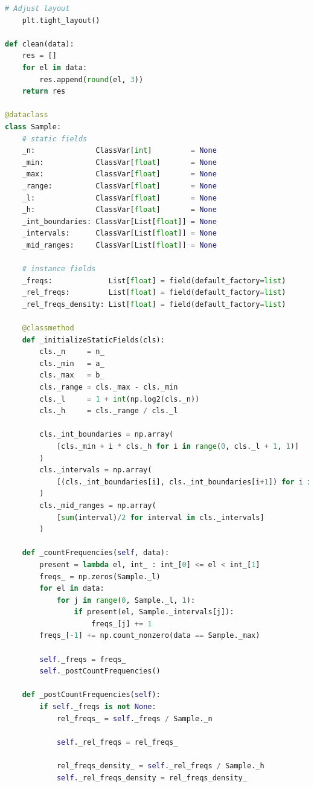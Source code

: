 \documentclass[a4paper, 14pt]{extarticle}
\begin{document}
\begin{center}
\begin{lstlisting}[language=Python]
    # Adjust layout
    plt.tight_layout()

def clean(data):
    res = []
    for el in data:
        res.append(round(el, 3))
    return res

@dataclass
class Sample:
    # static fields
    _n:              ClassVar[int]         = None
    _min:            ClassVar[float]       = None
    _max:            ClassVar[float]       = None
    _range:          ClassVar[float]       = None
    _l:              ClassVar[float]       = None
    _h:              ClassVar[float]       = None
    _int_boundaries: ClassVar[List[float]] = None
    _intervals:      ClassVar[List[float]] = None
    _mid_ranges:     ClassVar[List[float]] = None

    # instance fields
    _freqs:             List[float] = field(default_factory=list)
    _rel_freqs:         List[float] = field(default_factory=list)
    _rel_freqs_density: List[float] = field(default_factory=list)

    @classmethod
    def _initializeStaticFields(cls):
        cls._n     = n_
        cls._min   = a_
        cls._max   = b_
        cls._range = cls._max - cls._min
        cls._l     = 1 + int(np.log2(cls._n))
        cls._h     = cls._range / cls._l
        
        cls._int_boundaries = np.array(
            [cls._min + i * cls._h for i in range(0, cls._l + 1, 1)]
        )
        cls._intervals = np.array(
            [(cls._int_boundaries[i], cls._int_boundaries[i+1]) for i in range(0, cls._l, 1)]
        )
        cls._mid_ranges = np.array(
            [sum(interval)/2 for interval in cls._intervals]
        )

    def _countFrequencies(self, data):
        present = lambda el, int_ : int_[0] <= el < int_[1]
        freqs_ = np.zeros(Sample._l)
        for el in data:
            for j in range(0, Sample._l, 1):
                if present(el, Sample._intervals[j]):
                    freqs_[j] += 1 
        freqs_[-1] += np.count_nonzero(data == Sample._max)

        self._freqs = freqs_
        self._postCountFrequencies()

    def _postCountFrequencies(self):
        if self._freqs is not None:
            rel_freqs_ = self._freqs / Sample._n

            self._rel_freqs = rel_freqs_

            rel_freqs_density_ = self._rel_freqs / Sample._h
            self._rel_freqs_density = rel_freqs_density_


\end{lstlisting}
\end{center}
\end{document}
